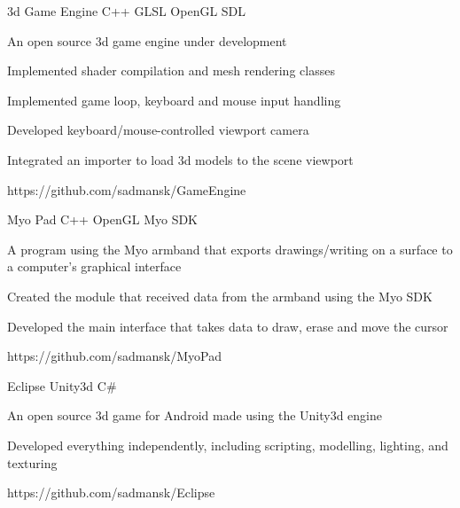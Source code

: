 



\begin{cvprojects}

\cvproject
{3d Game Engine}
{C++ \textbullet{} GLSL \textbullet{} OpenGL \textbullet{} SDL}
{
An open source 3d game engine under development
\begin{cvitems}
\item[]
\item {Implemented shader compilation and mesh rendering classes}
\item {Implemented game loop, keyboard and mouse input handling}
\item {Developed keyboard/mouse-controlled viewport camera} 
\item {Integrated an importer to load 3d models to the scene viewport} 
\end{cvitems}
}
{https://github.com/sadmansk/GameEngine}


\cvproject
{Myo Pad}
{C++ \textbullet{} OpenGL \textbullet{} Myo SDK}
{
A program using the Myo armband that exports drawings/writing on a surface to a computer's graphical interface 
\begin{cvitems}
\item[]
\item {Created the module that received data from the armband using the Myo SDK}
\item {Developed the main interface that takes data to draw, erase and move the cursor}
\end{cvitems}
}
{https://github.com/sadmansk/MyoPad}


\cvproject
{Eclipse}
{Unity3d \textbullet{} C\#}
{
An open source 3d game for Android made using the Unity3d engine
\begin{cvitems}
\item[]
\item {Developed everything independently, including scripting, modelling, lighting, and texturing}
\end{cvitems}
}
{https://github.com/sadmansk/Eclipse}


\end{cvprojects}
